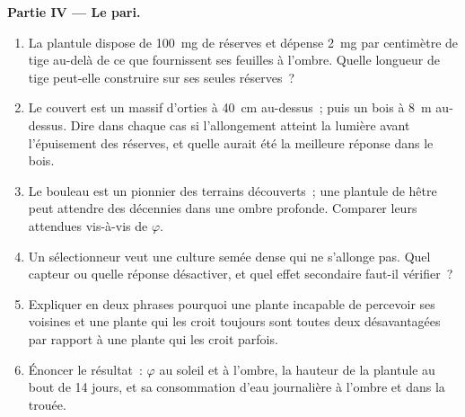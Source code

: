 \begin{problem}
\medskip
\noindent\textbf{Partie IV --- Le pari.}
\begin{enumerate}[resume]
  \item La plantule dispose de \qty{100}{mg} de réserves et dépense
        \qty{2}{mg} par centimètre de tige au-delà de ce que fournissent
        ses feuilles à l'ombre. Quelle longueur de tige peut-elle
        construire sur ses seules réserves~?
  \item Le couvert est un massif d'orties à \qty{40}{cm} au-dessus~;
        puis un bois à \qty{8}{m} au-dessus. Dire dans chaque cas si
        l'allongement atteint la lumière avant l'épuisement des réserves,
        et quelle aurait été la meilleure réponse dans le bois.
  \item Le bouleau est un pionnier des terrains découverts~; une
        plantule de hêtre peut attendre des décennies dans une ombre
        profonde. Comparer leurs  attendues vis-à-vis de
        $\varphi$.
  \item Un sélectionneur veut une culture semée dense qui ne s'allonge
        pas. Quel capteur ou quelle réponse désactiver, et quel effet
        secondaire faut-il vérifier~?
  \item Expliquer en deux phrases pourquoi une plante incapable de
        percevoir ses voisines et une plante qui les croit toujours sont
        toutes deux désavantagées par rapport à une plante qui les croit
        parfois.
  \item Énoncer le résultat~: $\varphi$ au soleil et à l'ombre, la
        hauteur de la plantule au bout de 14 jours, et sa consommation
        d'eau journalière à l'ombre et dans la trouée.
\end{enumerate}
\end{problem}

